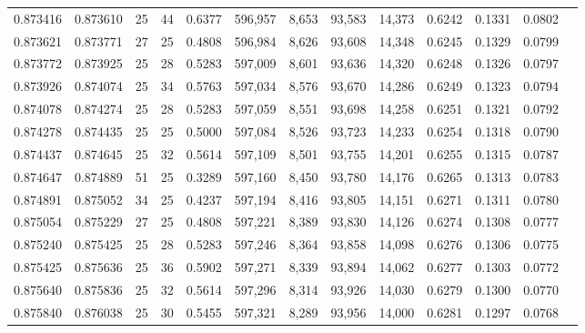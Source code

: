 \begin{tabular}{rrrrrrrrrrrrr}
0.873416 & 0.873610 &    25 &  44 &                                     0.6377 & 596,957 &   8,653 &  93,583 &  14,373 & 0.6242 & 0.1331 & 0.0802 \\
0.873621 & 0.873771 &    27 &  25 &                                     0.4808 & 596,984 &   8,626 &  93,608 &  14,348 & 0.6245 & 0.1329 & 0.0799 \\
0.873772 & 0.873925 &    25 &  28 &                                     0.5283 & 597,009 &   8,601 &  93,636 &  14,320 & 0.6248 & 0.1326 & 0.0797 \\
0.873926 & 0.874074 &    25 &  34 &                                     0.5763 & 597,034 &   8,576 &  93,670 &  14,286 & 0.6249 & 0.1323 & 0.0794 \\
0.874078 & 0.874274 &    25 &  28 &                                     0.5283 & 597,059 &   8,551 &  93,698 &  14,258 & 0.6251 & 0.1321 & 0.0792 \\
0.874278 & 0.874435 &    25 &  25 &                                     0.5000 & 597,084 &   8,526 &  93,723 &  14,233 & 0.6254 & 0.1318 & 0.0790 \\
0.874437 & 0.874645 &    25 &  32 &                                     0.5614 & 597,109 &   8,501 &  93,755 &  14,201 & 0.6255 & 0.1315 & 0.0787 \\
0.874647 & 0.874889 &    51 &  25 &                                     0.3289 & 597,160 &   8,450 &  93,780 &  14,176 & 0.6265 & 0.1313 & 0.0783 \\
0.874891 & 0.875052 &    34 &  25 &                                     0.4237 & 597,194 &   8,416 &  93,805 &  14,151 & 0.6271 & 0.1311 & 0.0780 \\
0.875054 & 0.875229 &    27 &  25 &                                     0.4808 & 597,221 &   8,389 &  93,830 &  14,126 & 0.6274 & 0.1308 & 0.0777 \\
0.875240 & 0.875425 &    25 &  28 &                                     0.5283 & 597,246 &   8,364 &  93,858 &  14,098 & 0.6276 & 0.1306 & 0.0775 \\
0.875425 & 0.875636 &    25 &  36 &                                     0.5902 & 597,271 &   8,339 &  93,894 &  14,062 & 0.6277 & 0.1303 & 0.0772 \\
0.875640 & 0.875836 &    25 &  32 &                                     0.5614 & 597,296 &   8,314 &  93,926 &  14,030 & 0.6279 & 0.1300 & 0.0770 \\
0.875840 & 0.876038 &    25 &  30 &                                     0.5455 & 597,321 &   8,289 &  93,956 &  14,000 & 0.6281 & 0.1297 & 0.0768 \\

\end{tabular}

